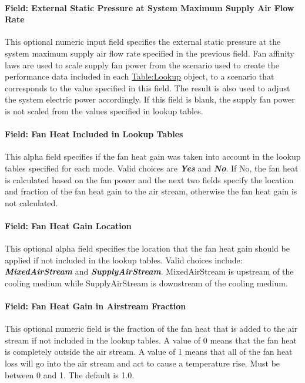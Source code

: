 \paragraph{Field: External Static Pressure at System Maximum Supply Air Flow Rate}
This optional numeric input field specifies the external static pressure at the system maximum supply air flow rate specified in the previous field. Fan affinity laws are used to scale supply fan power from the scenario used to create the performance data included in each \hyperref[tablelookup]{Table:Lookup} object, to a scenario that corresponds to the value specified in this field. The result is also used to adjust the system electric power accordingly. If this field is blank, the supply fan power is not scaled from the values specified in lookup tables.

\paragraph{Field: Fan Heat Included in Lookup Tables}
This alpha field specifies if the fan heat gain was taken into account in the lookup tables specified for each mode. Valid choices are \textbf{\emph{Yes}} and \textbf{\emph{No}}. If No, the fan heat is calculated based on the fan power and the next two fields specify the location and fraction of the fan heat gain to the air stream, otherwise the fan heat gain is not calculated.

\paragraph{Field: Fan Heat Gain Location}
This optional alpha field specifies the location that the fan heat gain should be applied if not included in the lookup tables. Valid choices include: \textbf{\emph{MixedAirStream}} and \textbf{\emph{SupplyAirStream}}. MixedAirStream is upstream of the cooling medium while SupplyAirStream is downstream of the cooling medium.

\paragraph{Field: Fan Heat Gain in Airstream Fraction}
This optional numeric field is the fraction of the fan heat that is added to the air stream if not included in the lookup tables. A value of 0 means that the fan heat is completely outside the air stream. A value of 1 means that all of the fan heat loss will go into the air stream and act to cause a temperature rise. Must be between 0 and 1. The default is 1.0.

